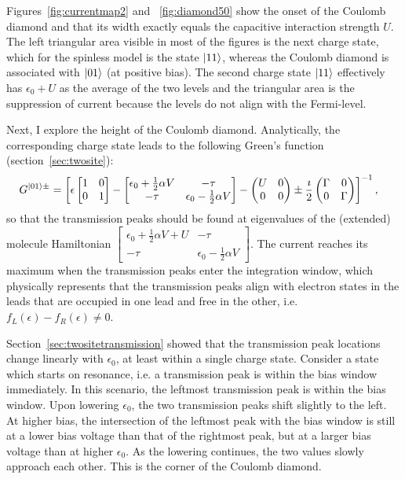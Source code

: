 Figures~\ref{fig:currentmap2} and ~\ref{fig:diamond50} show the onset of the Coulomb diamond and that its width exactly equals the capacitive interaction strength $U$. The left triangular area visible in most of the figures is the next charge state, which for the spinless model is the state $\ket{11}$, whereas the Coulomb diamond is associated with $\ket{01}$ (at positive bias). The second charge state $\ket{11}$ effectively has $\epsilon_0+U$ as the average of the two levels and the triangular area is the suppression of current because the levels do not align with the Fermi-level.

Next, I explore the height of the Coulomb diamond. Analytically, the corresponding charge state leads to the following Green's function (section~\ref{sec:twosite}):
\begin{align*}
G^{\ket{01}\pm} &= \left[ \epsilon \begin{bmatrix} 1 & 0 \\ 0 & 1 \end{bmatrix} - \begin{bmatrix} \epsilon_0 + \frac{1}{2} \alpha V & -\tau \\
-\tau & \epsilon_0 - \frac{1}{2} \alpha V\end{bmatrix} - \begin{pmatrix} U & 0 \\ 0 & 0 \end{pmatrix} \pm \frac{\imath}{2} \begin{pmatrix} \Gamma & 0 \\ 0 & \Gamma \end{pmatrix} \right]^{-1},
\end{align*}
so that the transmission peaks should be found at eigenvalues of the (extended) mole\-cule Hamiltonian  $\begin{bmatrix} \epsilon_0 + \frac{1}{2} \alpha V+U & -\tau \\
-\tau & \epsilon_0 - \frac{1}{2} \alpha V\end{bmatrix}$. The current reaches its maximum when the transmission peaks enter the integration window, which physically represents that the transmission peaks align with electron states in the leads that are occupied in one lead and free in the other, i.e. $f_L(\epsilon) - f_R(\epsilon) \neq 0$.

Section~\ref{sec:twositetransmission} showed that the transmission peak locations change linearly with $\epsilon_0$, at least within a single charge state. Consider a state which starts on resonance, i.e. a transmission peak is within the bias window immediately. In this scenario, the leftmost transmission peak is within the bias window. Upon lowering $\epsilon_0$, the two transmission peaks shift slightly to the left. At higher bias, the intersection of the leftmost peak with the bias window is still at a lower bias voltage than that of the rightmost peak, but at a larger bias voltage than at higher $\epsilon_0$. As the lowering continues, the two values slowly approach each other. This is the corner of the Coulomb diamond.

